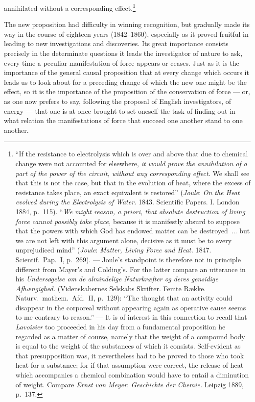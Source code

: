 \documentclass[12pt,a4paper]{book}
\begin{document}
annihilated without a corresponding effect.\footnote{``If the resistance to
electrolysis which is over and above that due to chemical change were not
accounted for elsewhere, \textit{it would prove the annihilation of a part of the
power of the circuit, without any corresponding effect.} We shall see that this
is not the case, but that in the evolution of heat, where the excess of
resistance takes place, an exact equivalent is restored'' (\emph{Joule}: \textit{On the
Heat evolved during the Electrolysis of Water.} 1843. Scientific Papers. I.
London 1884, p.~115). ``\textit{We might reason, a priori, that absolute
destruction of living force cannot possibly take place,} because it is manifestly
absurd to suppose that the powers with which God has endowed matter can be
destroyed~... but we are not left with this argument alone, decisive as it must
be to every unprejudiced mind'' (\emph{Joule}: \textit{Matter, Living Force and Heat.}
1847. Scientif.\ Pap.\ I, p.~269). --- Joule's standpoint is therefore not in
principle different from Mayer's and Colding's. For the latter compare an
utterance in his \textit{Undersøgelse om de almindelige Naturkræfter og deres
gensidige Afhængighed.} (Videnskabernes Selskabs Skrifter. Femte Række. Naturv.\
mathem.\ Afd.\ II, p.~129): ``The thought that an activity could disappear in
the corporeal without appearing again as operative cause seems to me contrary to
reason.'' --- It is of interest in this connection to recall that \emph{Lavoisier} too
proceeded in his day from a fundamental proposition he regarded as a matter of
course, namely that the weight of a compound body is equal to the weight of the
substances of which it consists. Self-evident as that presupposition was, it
nevertheless had to be proved to those who took heat for a substance; for if
that assumption were correct, the release of heat which accompanies a chemical
combination would have to entail a diminution of weight. Compare \emph{Ernst von Meyer}: \textit{Geschichte der Chemie.} Leipzig 1889, p.~137.}

The new proposition had difficulty in winning recognition, but gradually made
its way in the course of eighteen years (1842--1860), especially as it proved
fruitful in leading to new investigations and discoveries. Its great importance
consists precisely in the determinate questions it leads the investigator of
nature to ask, every time a peculiar manifestation of force appears or ceases.
Just as it is the importance of the general causal proposition that at every
change which occurs it leads us to look about for a preceding change of which
the new one might be the effect, so it is the importance of the proposition of
the conservation of force --- or, as one now prefers to say, following the
proposal of English investigators, of energy --- that one is at once brought to
set oneself the task of finding out in what relation the manifestations of force
that succeed one another stand to one another.
\end{document}
